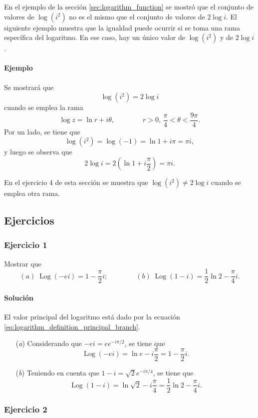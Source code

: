 \documentclass[a4paper]{report}
\DeclareMathOperator{\Log}{Log}
\begin{document}
En el ejemplo de la sección \ref{sec:logarithm_function} se mostró que el conjunto de valores de \(\log(i^2)\) no es el mismo que el conjunto de valores de \(2\log i\). El siguiente ejemplo muestra que la igualdad puede ocurrir si se toma una rama específica del logaritmo. En ese caso, hay un único valor de \(\log(i^2)\) y de \(2\log i\).

\paragraph{Ejemplo} Se mostrará que 
\[
 \log(i^2)=2\log i
\]
cuando se emplea la rama 
\[
 \log z=\ln r+i\theta,\qquad\qquad 
 r>0,\,\frac{\pi}{4}<\theta<\frac{9\pi}{4}.
\]
Por un lado, se tiene que 
\[
 \log(i^2)=\log(-1)=\ln1+i\pi=\pi i,
\]
y luego se observa que 
\[
 2\log i=2\left(\ln1+i\frac{\pi}{2}\right)=\pi i.
\]

En el ejercicio 4 de esta sección se muestra que \(\log(i^2)\neq2\log i\) cuando se emplea otra rama.

\subsection*{Ejercicios}

\subsubsection{Ejercicio 1}

Mostrar que
\[
 (\textit{a})\;\Log(-ei)=1-\frac{\pi}{2}i;\qquad\qquad 
 (\textit{b})\;\Log(1-i)=\frac{1}{2}\ln2-\frac{\pi}{4}i.
\]

\paragraph{Solución} El valor principal del logaritmo está dado por la ecuación \ref{eq:logarithm_definition_principal_branch}.

\begin{enumerate}
 \item[(\textit{a})] Considerando que \(-ei=ee^{-i\pi/2}\), se tiene que 
 \[
  \Log(-ei)=\ln e-i\frac{\pi}{2}=1-\frac{\pi}{2}i.
 \]
 \item[(\textit{b})] Teniendo en cuenta que \(1-i=\sqrt{2}e^{-i\pi/4}\), se tiene que 
 \[
  \Log(1-i)=\ln\sqrt{2}-i\frac{\pi}{4}=\frac{1}{2}\ln2-\frac{\pi}{4}i.
 \]
\end{enumerate}

\subsubsection{Ejercicio 2}
 
\end{document}
